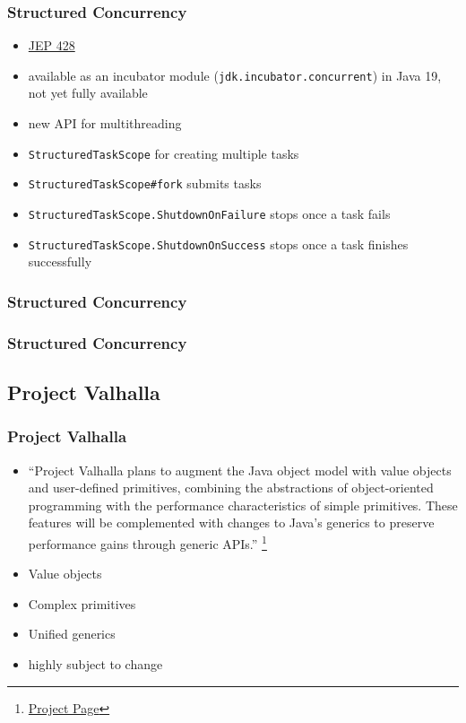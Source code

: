 \documentclass{beamer}
\begin{document}
\begin{frame}
\frametitle{Structured Concurrency}
\begin{itemize}
  \item \href{https://openjdk.org/jeps/428}{JEP 428}
  \item available as an incubator module (\texttt{jdk.incubator.concurrent}) in Java 19, not yet fully available
  \pause
  \item new API for multithreading
  \item \texttt{StructuredTaskScope} for creating multiple tasks
  \item \texttt{StructuredTaskScope\#fork} submits tasks
  \item \texttt{StructuredTaskScope.ShutdownOnFailure} stops once a task fails
  \item \texttt{StructuredTaskScope.ShutdownOnSuccess} stops once a task finishes successfully

\end{itemize}
\end{frame}
\begin{frame}
\frametitle{Structured Concurrency}

\end{frame}
\begin{frame}
\frametitle{Structured Concurrency}

\end{frame}

\subsection{Project Valhalla}
\begin{frame}
\frametitle{Project Valhalla}
\begin{itemize}
  \item ``Project Valhalla plans to augment the Java object model with value objects and user-defined primitives, combining the abstractions of object-oriented programming with the performance characteristics of simple primitives. These features will be complemented with changes to Java's generics to preserve performance gains through generic APIs.''
  \footnote{\href{https://openjdk.org/projects/valhalla/}{Project Page}}
  \pause
  \item Value objects
  \item Complex primitives
  \item Unified generics
  \item highly subject to change
\end{itemize}
\end{frame}
\end{document}

